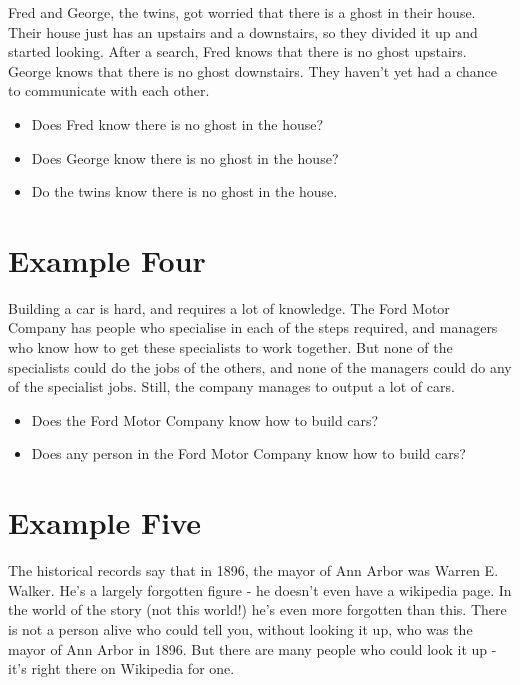 \documentclass[11pt,]{article}
\providecommand{\tightlist}{%
  \setlength{\itemsep}{0pt}\setlength{\parskip}{0pt}}
\begin{document}
Fred and George, the twins, got worried that there is a ghost in their
house. Their house just has an upstairs and a downstairs, so they
divided it up and started looking. After a search, Fred knows that there
is no ghost upstairs. George knows that there is no ghost downstairs.
They haven't yet had a chance to communicate with each other.

\begin{itemize}
\tightlist
\item
  Does Fred know there is no ghost in the house?
\item
  Does George know there is no ghost in the house?
\item
  Do the twins know there is no ghost in the house.
\end{itemize}

\newpage

\hypertarget{example-four}{%
\section{Example Four}\label{example-four}}

Building a car is hard, and requires a lot of knowledge. The Ford Motor
Company has people who specialise in each of the steps required, and
managers who know how to get these specialists to work together. But
none of the specialists could do the jobs of the others, and none of the
managers could do any of the specialist jobs. Still, the company manages
to output a lot of cars.

\begin{itemize}
\tightlist
\item
  Does the Ford Motor Company know how to build cars?
\item
  Does any person in the Ford Motor Company know how to build cars?
\end{itemize}

\hypertarget{example-five}{%
\section{Example Five}\label{example-five}}

The historical records say that in 1896, the mayor of Ann Arbor was
Warren E. Walker. He's a largely forgotten figure - he doesn't even have
a wikipedia page. In the world of the story (not this world!) he's even
more forgotten than this. There is not a person alive who could tell
you, without looking it up, who was the mayor of Ann Arbor in 1896. But
there are many people who could look it up - it's right there on
Wikipedia for one.
\end{document}
